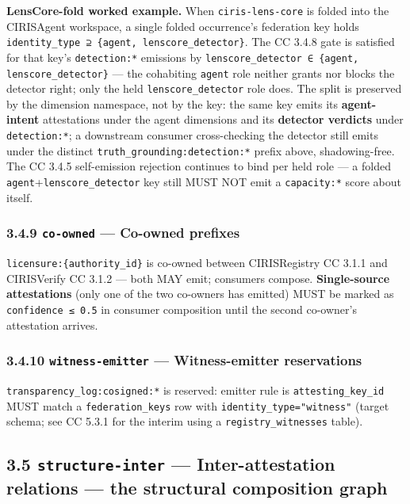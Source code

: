 \documentclass[11pt]{article}
\begin{document}
\textbf{LensCore-fold worked example.} When \texttt{ciris-lens-core} is folded into the CIRISAgent workspace, a single folded occurrence's federation key holds \texttt{identity\_type ⊇ \{agent, lenscore\_detector\}}. The CC 3.4.8 gate is satisfied for that key's \texttt{detection:*} emissions by \texttt{lenscore\_detector ∈ \{agent, lenscore\_detector\}} — the cohabiting \texttt{agent} role neither grants nor blocks the detector right; only the held \texttt{lenscore\_detector} role does. The split is preserved by the dimension namespace, not by the key: the same key emits its \textbf{agent-intent} attestations under the agent dimensions and its \textbf{detector verdicts} under \texttt{detection:*}; a downstream consumer cross-checking the detector still emits under the distinct \texttt{truth\_grounding:detection:*} prefix above, shadowing-free. The CC 3.4.5 self-emission rejection continues to bind per held role — a folded \texttt{agent}+\texttt{lenscore\_detector} key still MUST NOT emit a \texttt{capacity:*} score about itself.


\subsubsection*{3.4.9 \texttt{co-owned} — Co-owned prefixes}


\texttt{licensure:\{authority\_id\}} is co-owned between CIRISRegistry CC 3.1.1 and CIRISVerify CC 3.1.2 — both MAY emit; consumers compose. \textbf{Single-source attestations} (only one of the two co-owners has emitted) MUST be marked as \texttt{confidence ≤ 0.5} in consumer composition until the second co-owner's attestation arrives.


\subsubsection*{3.4.10 \texttt{witness-emitter} — Witness-emitter reservations}


\texttt{transparency\_log:cosigned:*} is reserved: emitter rule is \texttt{attesting\_key\_id} MUST match a \texttt{federation\_keys} row with \texttt{identity\_type="witness"} (target schema; see CC 5.3.1 for the interim using a \texttt{registry\_witnesses} table).


\subsection*{3.5 \texttt{structure-inter} — Inter-attestation relations — the structural composition graph}
\end{document}
